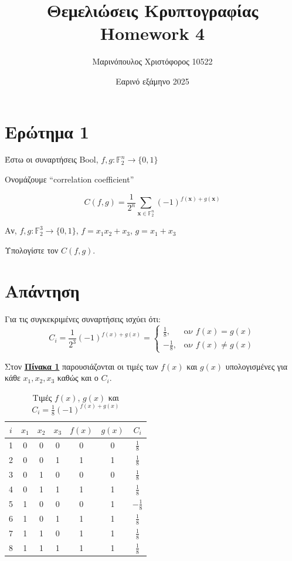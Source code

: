 \documentclass[12pt]{article}
\title{\vspace{-2cm} Θεμελιώσεις Κρυπτογραφίας \\
        Homework 4}
\author{Μαρινόπουλος Χριστόφορος 10522}
\date{Εαρινό εξάμηνο 2025}
\begin{document}
\maketitle
\section*{Ερώτημα 1}
Έστω οι συναρτήσεις Bool, \( f, g : \mathbb{F}_2^n \rightarrow \{0,1\} \)

Ονομάζουμε ``correlation coefficient''

\[
C(f, g) = \frac{1}{2^n} \sum_{\mathbf{x} \in \mathbb{F}_2^n} (-1)^{f(\mathbf{x}) + g(\mathbf{x})}
\]

Αν, \quad 
\( f, g : \mathbb{F}_2^3 \rightarrow \{0,1\} \), \quad 
\( f = x_1 x_2 + x_3 \), \quad 
\( g = x_1 + x_3 \)

Υπολογίστε τον \( C(f, g) \).

\section*{Απάντηση}
Για τις συγκεκριμένες συναρτήσεις ισχύει ότι:
\[
C_i = \frac{1}{2^3} (-1)^{f(x) + g(x)} =
\begin{cases}
\frac{1}{8}, & \text{αν } f(x) = g(x) \\
-\frac{1}{8}, & \text{αν } f(x) \ne g(x)
\end{cases}
\]




Στον \textbf{\protect\hyperref[πίνακας 1]{Πίνακα 1}} παρουσιάζονται οι τιμές των \( f(x) \) και \(g(x)\) υπολογισμένες για κάθε \( x_1 , x_2 , x_3 \) καθώς και ο \(C_i\).

\renewcommand{\arraystretch}{1.8} %

\begin{table}[h!]
\centering
\caption{Τιμές \( f(x) \), \( g(x) \) και \( C_i = \frac{1}{8}(-1)^{f(x) + g(x)} \)}
\label{πίνακας 1}
\begin{tabular}{|c||c|c|c||c|c||c|}
\hline
\( i \) & \( x_1 \) & \( x_2 \) & \( x_3 \) & \( f(x) \) & \( g(x) \) & \( C_i \) \\
\hline
1 & 0 & 0 & 0 & 0 & 0 & \( \frac{1}{8} \) \\
\hline
2 & 0 & 0 & 1 & 1 & 1 & \( \frac{1}{8} \) \\
\hline
3 & 0 & 1 & 0 & 0 & 0 & \( \frac{1}{8} \) \\
\hline
4 & 0 & 1 & 1 & 1 & 1 & \( \frac{1}{8} \) \\
\hline
5 & 1 & 0 & 0 & 0 & 1 & \( -\frac{1}{8} \) \\
\hline
6 & 1 & 0 & 1 & 1 & 1 & \( \frac{1}{8} \) \\
\hline
7 & 1 & 1 & 0 & 1 & 1 & \( \frac{1}{8} \) \\
\hline
8 & 1 & 1 & 1 & 1 & 1 & \( \frac{1}{8} \) \\
\hline
\end{tabular}
\end{table}
 
\end{document}
